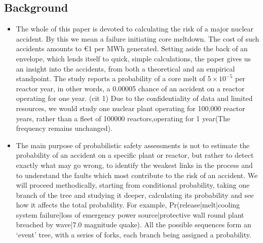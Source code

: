 \documentclass{article}
\begin{document}
\subsection{Background}
\begin{itemize}
    \item The whole of this paper is devoted to calculating the risk of a major nuclear accident.  By this we mean a failure initiating core meltdown. The cost of such accidents amounts to €1 per MWh generated. Setting aside the back of an envelope, which lends itself to quick, simple calculations, the paper gives us an insight into the accidents, from both a theoretical and an empirical standpoint. The study reports a probability of a core melt of $5\times10^{-5}$ per reactor year, in other words, a 0.00005 chance of an accident on a reactor operating for one year. (cit 1) Due to the confidentiality of data and limited resources, we would study one nuclear plant operating for 100,000 reactor years, rather than a fleet of 100000 reactors,operating for 1 year(The frequency remains unchanged).


    \item
    The main purpose of probabilistic safety assessments is not to estimate the probability of an accident on a specific plant or reactor, but rather to detect exactly what may go wrong, to identify the weakest links in the process and to understand the faults which most contribute to the risk of an accident. We will proceed methodically, starting from conditional probability, taking one branch of the tree and studying it deeper, calculating its probability and see how it affects the total probability. For example, Pr(release|melt|cooling system failure|loss of emergency power source|protective wall round plant breached by wave|7.0 magnitude quake). All the possible sequences form an ‘event’ tree, with a series of forks, each branch being assigned a probability.


\end{itemize}
\end{document}
